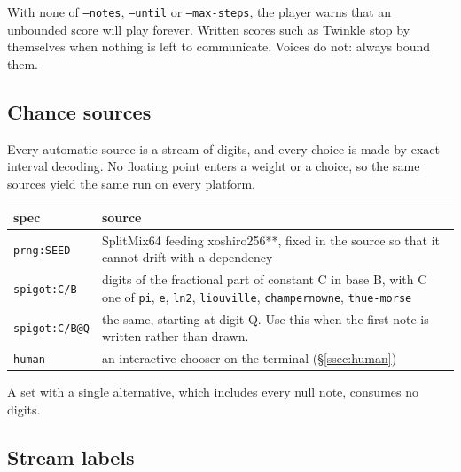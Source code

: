 \documentclass[11pt,a4paper]{article}
\newcommand{\ttx}[1]{\texttt{#1}}
\begin{document}
\noindent With none of \ttx{--notes}, \ttx{--until} or \ttx{--max-steps}, the
player warns that an unbounded score will play forever. Written scores such as
Twinkle stop by themselves when nothing is left to communicate. Voices do not:
always bound them.

\subsection{Chance sources}\label{ssec:chance}

Every automatic source is a stream of digits, and every choice is made by exact
interval decoding. No floating point enters a weight or a choice, so the same
sources yield the same run on every platform.

\begin{center}
\small
\begin{tabularx}{\linewidth}{@{}l>{\raggedright\arraybackslash}X@{}}
\toprule
spec & source \\
\midrule
\ttx{prng:SEED} & SplitMix64 feeding xoshiro256**, fixed in the source so that
  it cannot drift with a dependency \\
\ttx{spigot:C/B} & digits of the fractional part of constant C in base B, with
  C one of \ttx{pi}, \ttx{e}, \ttx{ln2}, \ttx{liouville}, \ttx{champernowne},
  \ttx{thue-morse} \\
\ttx{spigot:C/B@Q} & the same, starting at digit Q. Use this when the first
  note is written rather than drawn. \\
\ttx{human} & an interactive chooser on the terminal (\S\ref{ssec:human}) \\
\bottomrule
\end{tabularx}
\end{center}

\noindent A set with a single alternative, which includes every null note,
consumes no digits.

\subsection{Stream labels}\label{ssec:streams}
\end{document}
